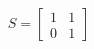 \documentclass[preview]{standalone}
\begin{document}
\begin{align*}
S=\begin{bmatrix}1&1\\0&1\end{bmatrix}
\end{align*}
\end{document}

